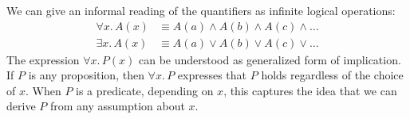 We can give an informal reading of the quantifiers as infinite logical operations:
\begin{align*}
\forall x.\,A(x) &\equiv A(a) \land A(b) \land A(c) \land \ldots \\
\exists x.\,A(x) &\equiv A(a) \lor A(b) \lor A(c) \lor \ldots
\end{align*}
The expression $\forall x.\, P(x)$ can be understood as  generalized form of implication. 
If $P$ is any proposition, then $\forall x.\, P$ expresses that $P$ holds 
regardless of the choice of $x$. When $P$ is a predicate, depending on $x$, this captures the 
idea that we can derive $P$ from any assumption about $x$.
